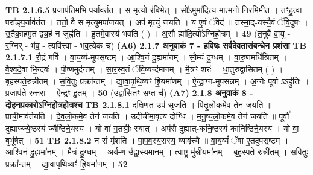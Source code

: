 \documentclass[17pt]{extarticle}
\begin{document}
                  \newline
                                \textbf{ TB 2.1.6.5} \newline
                  प्र॒जाप॑तिम॒भि प॒र्याव॑र्तत । स मृ॒त्यो-र॑बिभेत् । सो॑ऽमुमा॑दि॒त्य-मा॒त्मनो॒ निर॑मिमीत । तꣳहु॒त्वा परा᳚ङ्प॒र्याव॑र्तत । ततो॒ वै स मृ॒त्युमपा॑जयत् । अप॑ मृ॒त्युं ज॑यति । य ए॒वं ॅवेद॑ ॥ तस्मा॒द्-यस्यै॒वं ॅवि॒दुषः॑ । उ॒तैका॒हमु॒त द्व्य॒हं न जुह्व॑ति । हु॒तमे॒वास्य॑ भवति ( ) । अ॒सौ ह्या॑दि॒त्यो᳚ऽग्निहो॒त्रम् । \textbf{ 49} \newline
                  \newline
                                    (त॒नुवै॑ वा॒यु - र॒ग्निर् - भ॑व॒ - त्यवि॑त्त्वा - भव॒त्येकं॑ च) \textbf{(A6)} \newline \newline
                \textbf{ 2.1.7     अनुवाकं   7 - हविषः सर्वदेवतासंबन्धेन प्रशंसा} \newline
                                \textbf{ TB 2.1.7.1} \newline
                  रौ॒द्रं गवि॑ । वा॒य॒व्य॑-मुप॑सृष्टम् । आ॒श्वि॒नं दु॒ह्यमा॑नम् । सौ॒म्यं दु॒ग्धम् । वा॒रु॒णमधि॑श्रितम् । वै॒श्व॒दे॒वा भि॒न्दवः॑ । पौ॒ष्णमुद॑न्तम् । सा॒र॒स्व॒तं ॅवि॒ष्यन्द॑मानम् । मै॒त्रꣳ शरः॑ । धा॒तुरुद्वा॑सितम् ( ) । बृह॒स्पते॒रुन्नी॑तम् । स॒वि॒तुः प्रक्रा᳚न्तम् । द्या॒वा॒पृ॒थि॒व्यꣳ॑ ह्रि॒यमा॑णम् । ऐ॒न्द्रा॒ग्न-मुप॑सन्नम् । अ॒ग्नेः पूर्वा ऽऽहु॑तिः । प्र॒जाप॑ते॒-रुत्त॑रा । ऐ॒न्द्रꣳ हु॒तम् । \textbf{ 50} \newline
                  \newline
                                    (उद्वा॑सितꣳ स॒प्त च॑) \textbf{(A7)} \newline \newline
                \textbf{ 2.1.8     अनुवाकं   8 - दोहनप्रकारोऽग्निहोत्रहोत्रश्च} \newline
                                \textbf{ TB 2.1.8.1} \newline
                  द॒क्षि॒ण॒त उप॑ सृजति । पि॒तृ॒लो॒कमे॒व तेन॑ जयति ॥ प्राची॒माव॑र्तयति । दे॒व॒लो॒कमे॒व तेन॑ जयति । उदी॑चीमा॒वृत्य॑ दोग्धि । म॒नु॒ष्य॒लो॒कमे॒व तेन॑ जयति ॥ पूर्वौ॑ दुह्याज्ज्ये॒ष्ठस्य॑ ज्यैष्ठिने॒यस्य॑ । यो वा॑ ग॒तश्रीः॒ स्यात् । अप॑रौ दुह्यात्-कनि॒ष्ठस्य॑ कानिष्ठिने॒यस्य॑ । यो वा॒ बुभू॑षेत् । \textbf{ 51} \newline
                  \newline
                                \textbf{ TB 2.1.8.2} \newline
                  न सं मृ॑शति । पा॒प॒व॒स्य॒सस्य॒ व्यावृ॑त्त्यै ॥ वा॒य॒व्यं॑ ॅवा ए॒तदुप॑सृष्टम् । आ॒श्वि॒नं दु॒ह्यमा॑नम् । मै॒त्रं दु॒ग्धम् । अ॒र्य॒म्ण उ॑द्वा॒स्यमा॑नम् । त्वा॒ष्ट्र-मु॑न्नी॒यमा॑नम् । बृह॒स्पते॒-रुन्नी॑तम् । स॒वि॒तुः प्रक्रा᳚न्तम् । द्या॒वा॒पृ॒थि॒व्यꣳ॑ ह्रि॒यमा॑णम् । \textbf{ 52} \newline
\end{document}
